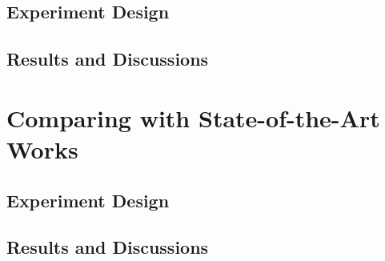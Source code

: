 \subsection{Experiment Design}

\subsection{Results and Discussions}
\section{Comparing with State-of-the-Art Works}
\subsection{Experiment Design}
\subsection{Results and Discussions}
